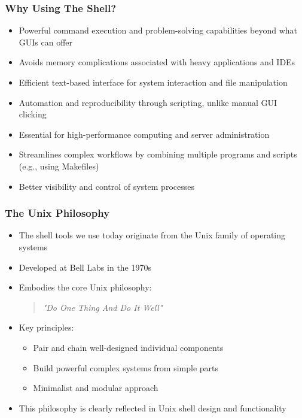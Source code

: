 \documentclass[10pt]{beamer}
\begin{document}
\begin{frame}
    \frametitle{Why Using The Shell?}
    \begin{itemize}
        \item Powerful command execution and problem-solving capabilities beyond what GUIs can offer
        \item Avoids memory complications associated with heavy applications and IDEs
        \item Efficient text-based interface for system interaction and file manipulation
        \item Automation and reproducibility through scripting, unlike manual GUI clicking
        \item Essential for high-performance computing and server administration
        \item Streamlines complex workflows by combining multiple programs and scripts (e.g., using Makefiles)
        \item Better visibility and control of system processes
    \end{itemize}
\end{frame}

\begin{frame}
    \frametitle{The Unix Philosophy}
    \begin{itemize}
        \item The shell tools we use today originate from the Unix family of operating systems
        \item Developed at Bell Labs in the 1970s
        \item Embodies the core Unix philosophy:
        \begin{quote}
            \textit{"Do One Thing And Do It Well"}
        \end{quote}
        \item Key principles:
        \begin{itemize}
            \item Pair and chain well-designed individual components
            \item Build powerful complex systems from simple parts
            \item Minimalist and modular approach
        \end{itemize}
        \item This philosophy is clearly reflected in Unix shell design and functionality
    \end{itemize}
\end{frame}
\end{document}
